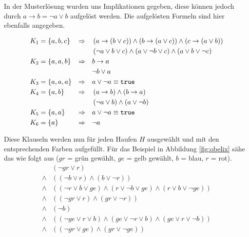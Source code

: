 \documentclass{article}
\begin{document}
In der Musterlösung wurden uns Implikationen gegeben, diese können jedoch durch $a \rightarrow b = \neg a \vee b$ aufgelöst werden. Die aufgelösten Formeln sind hier ebenfalls angegeben.

\begin{align*}
K_1 &= \left\{ a, b, c \right\} & \Rightarrow &&& \left(a \rightarrow (b \vee c) \right) \wedge \left(b \rightarrow (a \vee c) \right) \wedge \left(c \rightarrow (a \vee b) \right) \\
    &                           &             &&& \left(\neg a \vee b \vee c \right) \wedge \left(a \vee \neg b \vee c \right) \wedge \left(a \vee b \vee \neg c \right) \\
K_2 &= \left\{ a, a, b \right\} & \Rightarrow &&& b \rightarrow a \\
    &                           &             &&& \neg b \vee a \\
K_3 &= \left\{ a, a, a \right\} & \Rightarrow &&& a \vee \neg a \equiv \text{\texttt{true}} \\
K_4 &= \left\{ a, b \right\}    & \Rightarrow &&& \left( a \rightarrow b \right) \wedge \left( b \rightarrow a \right) \\
    &                           &             &&& \left( \neg a \vee b \right) \wedge \left( a \vee \neg b \right) \\
K_5 &= \left\{ a, a \right\}    & \Rightarrow &&& a \vee \neg a \equiv \text{\texttt{true}} \\
K_6 &= \left\{ a \right\}       & \Rightarrow &&& \neg a 
\end{align*}

Diese Klauseln werden nun für jeden Haufen $H$ ausgewählt und mit den entsprechenden Farben aufgefüllt. Für das Beispiel in Abbildung \ref{fig:obelix} sähe das wie folgt aus ($gr$ = grün gewählt, $ge$ = gelb gewählt, $b$ = blau, $r$ = rot).
\begin{align*}
       &\left(\neg gr \vee r \right) \\
\wedge &\left( \left( \neg b \vee r \right) \wedge \left( b \vee \neg r \right) \right) \\
\wedge &\left( \left(\neg r \vee b \vee ge \right) \wedge \left(r \vee \neg b \vee ge \right) \wedge \left(r \vee b \vee \neg ge \right) \right) \\
\wedge &\left( \left( \neg gr \vee r \right) \wedge \left( gr \vee \neg r \right) \right) \\
\wedge &\left( \neg b \right) \\
\wedge &\left( \left(\neg ge \vee r \vee b \right) \wedge \left(ge \vee \neg r \vee b \right) \wedge \left(ge \vee r \vee \neg b \right) \right) \\
\wedge &\left( \left( \neg gr \vee ge \right) \wedge \left( gr \vee \neg ge \right) \right) \\
\end{align*}
\end{document}
